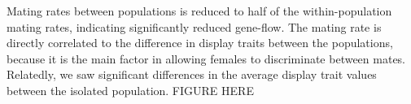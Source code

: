 Mating rates between populations is reduced to half of the within-population mating rates, indicating significantly reduced gene-flow. The mating rate is directly correlated to the difference in display traits between the populations, because it is the main factor in allowing females to discriminate between mates. 
Relatedly, we saw significant differences in the average display trait values between the isolated population.
FIGURE HERE
